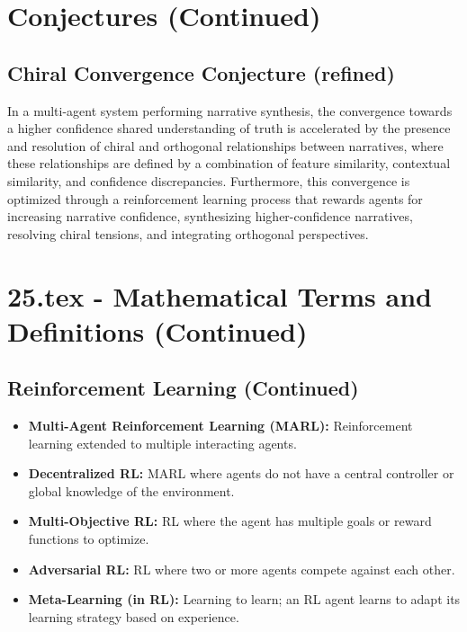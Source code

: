 \documentclass[12pt, a4paper]{article}
\begin{document}
\section{Conjectures (Continued)}

\subsection{Chiral Convergence Conjecture (refined)}

In a multi-agent system performing narrative synthesis, the convergence towards a higher confidence shared understanding of truth is accelerated by the presence and resolution of chiral and orthogonal relationships between narratives, where these relationships are defined by a combination of feature similarity, contextual similarity, and confidence discrepancies.  Furthermore, this convergence is optimized through a reinforcement learning process that rewards agents for increasing narrative confidence, synthesizing higher-confidence narratives, resolving chiral tensions, and integrating orthogonal perspectives.


 
 
\section{25.tex - Mathematical Terms and Definitions (Continued)}

\subsection{Reinforcement Learning (Continued)}

\begin{itemize}
    \item \textbf{Multi-Agent Reinforcement Learning (MARL): } Reinforcement learning extended to multiple interacting agents.
    \item \textbf{Decentralized RL: } MARL where agents do not have a central controller or global knowledge of the environment.
    \item \textbf{Multi-Objective RL: } RL where the agent has multiple goals or reward functions to optimize.
    \item \textbf{Adversarial RL: } RL where two or more agents compete against each other.
    \item \textbf{Meta-Learning (in RL): }  Learning to learn;  an RL agent learns to adapt its learning strategy based on experience.
\end{itemize}
\end{document}
